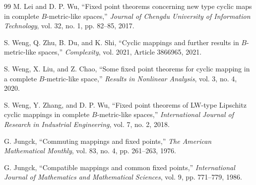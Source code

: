 \documentclass[11pt,a4paper,margin=1in]{amsart}
\theoremstyle{plain}
\theoremstyle{definition}
\theoremstyle{remark}
\begin{document}
\begin{thebibliography}{99}
M. Lei and D. P. Wu,
``Fixed point theorems concerning new type cyclic maps in complete
$B$-metric-like spaces,''
\emph{Journal of Chengdu University of Information Technology},
vol. 32, no. 1, pp. 82--85, 2017.

S. Weng, Q. Zhu, B. Du, and K. Shi,
``Cyclic mappings and further results in $B$-metric-like spaces,''
\emph{Complexity}, vol. 2021, Article 3866965, 2021.

S. Weng, X. Liu, and Z. Chao,
``Some fixed point theorems for cyclic mapping in a complete
$B$-metric-like space,''
\emph{Results in Nonlinear Analysis}, vol. 3, no. 4, 2020.

S. Weng, Y. Zhang, and D. P. Wu,
``Fixed point theorems of LW-type Lipschitz cyclic mappings in complete
$B$-metric-like spaces,''
\emph{International Journal of Research in Industrial Engineering},
vol. 7, no. 2, 2018.

G. Jungck,
``Commuting mappings and fixed points,''
\emph{The American Mathematical Monthly}, vol. 83, no. 4,
pp. 261--263, 1976.

G. Jungck,
``Compatible mappings and common fixed points,''
\emph{International Journal of Mathematics and Mathematical Sciences},
vol. 9, pp. 771--779, 1986.

\end{thebibliography}
\end{document}
